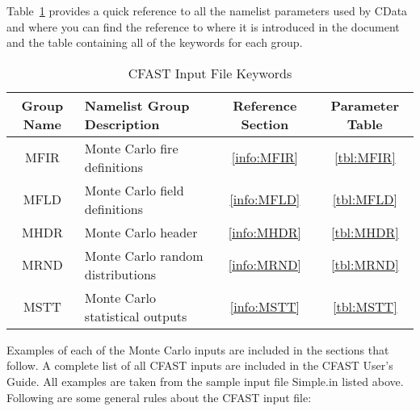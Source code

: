 Table~\ref{tbl:namelistgroups} provides a quick reference to all the namelist parameters used by CData and where you can find the reference to where it is introduced in the document and the table containing all of the keywords for each group.


\begin{table}[ht]
\begin{center}
\caption{CFAST Input File Keywords}
\label{tbl:namelistgroups}
\begin{tabular}{|c|l|c|c|}
\hline
Group Name   & Namelist Group Description       & Reference Section & Parameter Table  \\ \hline
{\ct MFIR}   & Monte Carlo fire definitions     & \ref{info:MFIR}   & \ref{tbl:MFIR}   \\ \hline
{\ct MFLD}   & Monte Carlo field definitions    & \ref{info:MFLD}   & \ref{tbl:MFLD}   \\ \hline
{\ct MHDR}   & Monte Carlo header               & \ref{info:MHDR}   & \ref{tbl:MHDR}   \\ \hline
{\ct MRND}   & Monte Carlo random distributions & \ref{info:MRND}   & \ref{tbl:MRND}   \\ \hline
{\ct MSTT}   & Monte Carlo statistical outputs  & \ref{info:MSTT}   & \ref{tbl:MSTT}   \\ \hline
\end{tabular}
\end{center}
\end{table}

Examples of each of the Monte Carlo inputs are included in the sections that follow. A complete list of all CFAST inputs are included in the CFAST User's Guide.  All examples are taken from the sample input file {\ct Simple.in} listed above. Following are some general rules about the CFAST input file:

